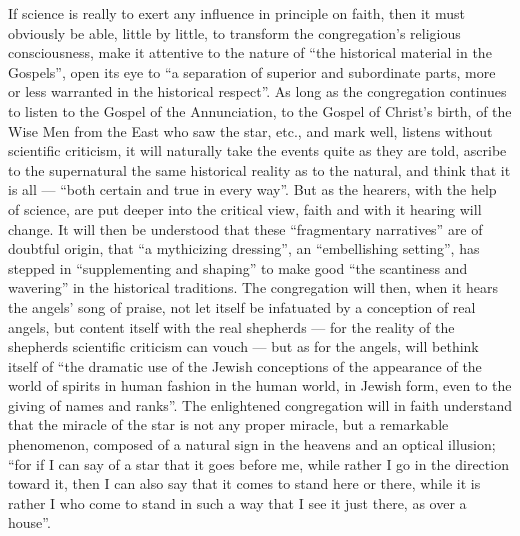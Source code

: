 \documentclass[12pt,a4paper,openany]{book}
\newcommand{\opage}[1]{\marginnote{\footnotesize\textit{[#1]}}}
\begin{document}
If science is really to exert any influence in principle
on faith, then it must obviously be
able, little by little, to transform the congregation's
\setcounter{footnote}{0}%
\opage{297}religious consciousness, make it attentive to the nature
of ``the historical material in the Gospels'', open
its eye to ``a separation of superior and subordinate parts,
more or less warranted in the historical respect''. As long as the congregation continues to listen
to the Gospel of the Annunciation, to the Gospel of Christ's
birth, of the Wise Men from the East who saw the star, etc.,
and mark well, listens without scientific criticism, it
will naturally take the events quite as they
are told, ascribe to the supernatural the same historical
reality as to the natural, and think that it is all
--- ``both certain and true in every way''. But
as the hearers, with the help of science,
are put deeper into the critical view, faith
and with it hearing will change. It will then be understood
that these ``fragmentary narratives'' are of
doubtful origin, that ``a mythicizing dressing'',
an ``embellishing setting'', has stepped in ``supplementing and
shaping'' to make good ``the scantiness and wavering''
in the historical traditions. The congregation will
then, when it hears the angels' song of praise, not let itself be
infatuated by a conception of real angels, but
content itself with the real shepherds --- for the reality
of the shepherds scientific criticism can vouch ---
but as for the angels, will bethink itself of ``the dramatic
use of the Jewish conceptions of the appearance of the world of spirits
in human fashion in the human
world, in Jewish form, even to the giving of names
and ranks''. The enlightened congregation will in faith
understand that the miracle of the star is not any proper
miracle, but a remarkable phenomenon, composed of
\setcounter{footnote}{0}%
\opage{298}a natural sign in the heavens and an optical illusion; ``for if
I can say of a star that it goes before me, while
rather I go in the direction toward it, then
I can also say that it comes to stand here
or there, while it is rather I who come
to stand in such a way that I see it just there, as
over a house''.
\end{document}
